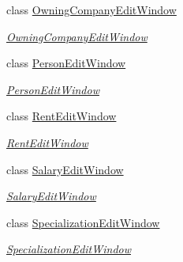 \begin{DoxyCompactItemize}
class \hyperlink{class_baudi_1_1_client_1_1_view_1_1_edit_windows_1_1_owning_company_edit_window}{Owning\+Company\+Edit\+Window}
\begin{DoxyCompactList}\small\item\em \hyperlink{class_baudi_1_1_client_1_1_view_1_1_edit_windows_1_1_owning_company_edit_window}{Owning\+Company\+Edit\+Window} \end{DoxyCompactList}\item 
class \hyperlink{class_baudi_1_1_client_1_1_view_1_1_edit_windows_1_1_person_edit_window}{Person\+Edit\+Window}
\begin{DoxyCompactList}\small\item\em \hyperlink{class_baudi_1_1_client_1_1_view_1_1_edit_windows_1_1_person_edit_window}{Person\+Edit\+Window} \end{DoxyCompactList}\item 
class \hyperlink{class_baudi_1_1_client_1_1_view_1_1_edit_windows_1_1_rent_edit_window}{Rent\+Edit\+Window}
\begin{DoxyCompactList}\small\item\em \hyperlink{class_baudi_1_1_client_1_1_view_1_1_edit_windows_1_1_rent_edit_window}{Rent\+Edit\+Window} \end{DoxyCompactList}\item 
class \hyperlink{class_baudi_1_1_client_1_1_view_1_1_edit_windows_1_1_salary_edit_window}{Salary\+Edit\+Window}
\begin{DoxyCompactList}\small\item\em \hyperlink{class_baudi_1_1_client_1_1_view_1_1_edit_windows_1_1_salary_edit_window}{Salary\+Edit\+Window} \end{DoxyCompactList}\item 
class \hyperlink{class_baudi_1_1_client_1_1_view_1_1_edit_windows_1_1_specialization_edit_window}{Specialization\+Edit\+Window}
\begin{DoxyCompactList}\small\item\em \hyperlink{class_baudi_1_1_client_1_1_view_1_1_edit_windows_1_1_specialization_edit_window}{Specialization\+Edit\+Window} \end{DoxyCompactList}\end{DoxyCompactItemize}
